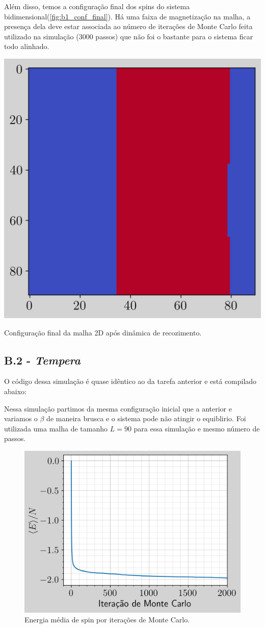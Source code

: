 Além disso, temos a configuração final dos spins do sistema bidimensional(\ref{fig:b1_conf_final}). 
Há uma faixa de magnetização na malha, a presença dela deve estar associada ao número de iterações de Monte Carlo feita
utilizado na simulação ($3000$ passos) que não foi o bastante para o sistema ficar todo alinhado. 

\begin{marginfigure}
    \centering
    \includegraphics[width=0.8\linewidth]{graficos/tarefa-2/graf-tarefa-B1-conf-final.png}
    \caption{Configuração final da malha 2D após dinâmica de recozimento.}
    \label{fig:b1_conf_final}
\end{marginfigure}

\subsection{B.2 - \emph{Tempera}}
O código dessa simulação é quase idêntico ao da tarefa anterior e está compilado abaixo: 


Nessa simulação partimos da mesma configuração inicial que a anterior 
e  variamos o $\beta$ de maneira brusca e o sistema pode não atingir o equiblirio. Foi utilizada 
uma malha de tamanho $L= 90$ para essa simulação e mesmo número de passos. 

\begin{figure}
    \centering
    \includegraphics[width=0.6\linewidth]{graficos/tarefa-2/graf-tarefa-B2-mag-eng.png}
    \caption{Energia média de spin por iterações de Monte Carlo.}
\end{figure}

